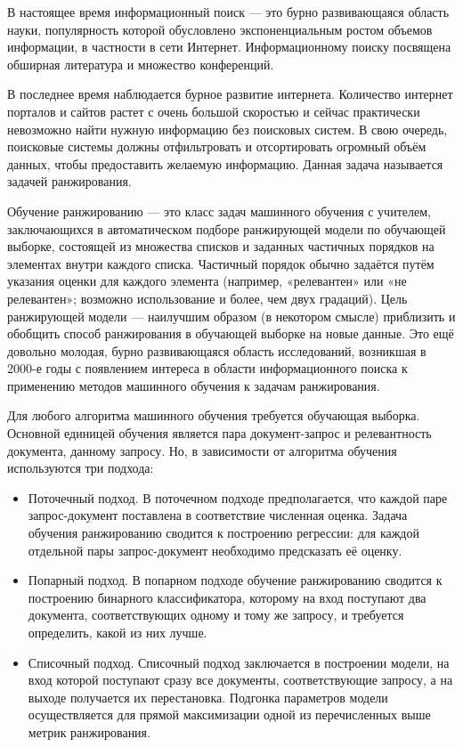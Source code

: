 В настоящее время информационный поиск — это бурно развивающаяся область науки, популярность которой обусловлено экспоненциальным ростом объемов информации, в частности в сети Интернет. Информационному поиску посвящена обширная литература и множество конференций.

В последнее время наблюдается бурное развитие интернета. Количество интернет порталов и сайтов растет с очень большой скоростью и сейчас практически невозможно найти нужную информацию без поисковых систем. В свою очередь, поисковые системы должны отфильтровать и отсортировать огромный объём данных, чтобы предоставить желаемую информацию. Данная задача называется задачей ранжирования. 

Обучение ранжированию — это класс задач машинного обучения с учителем, заключающихся в автоматическом подборе ранжирующей модели по обучающей выборке, состоящей из множества списков и заданных частичных порядков на элементах внутри каждого списка. Частичный порядок обычно задаётся путём указания оценки для каждого элемента (например, «релевантен» или «не релевантен»; возможно использование и более, чем двух градаций). Цель ранжирующей модели — наилучшим образом (в некотором смысле) приблизить и обобщить способ ранжирования в обучающей выборке на новые данные. Это ещё довольно молодая, бурно развивающаяся область исследований, возникшая в 2000-е годы с появлением интереса в области информационного поиска к применению методов машинного обучения к задачам ранжирования.

Для любого алгоритма машинного обучения требуется обучающая выборка. Основной единицей обучения является пара документ-запрос и релевантность документа, данному запросу. Но, в зависимости от алгоритма обучения используются три подхода: 

\begin{itemize}

	\item Поточечный подход. В поточечном подходе предполагается, что каждой паре запрос-документ поставлена в соответствие численная оценка. Задача обучения ранжированию сводится к построению регрессии: для каждой отдельной пары запрос-документ необходимо предсказать её оценку.

	\item Попарный подход. В попарном подходе обучение ранжированию сводится к построению бинарного классификатора, которому на вход поступают два документа, соответствующих одному и тому же запросу, и требуется определить, какой из них лучше.

	\item Списочный подход. Списочный подход заключается в построении модели, на вход которой поступают сразу все документы, соответствующие запросу, а на выходе получается их перестановка. Подгонка параметров модели осуществляется для прямой максимизации одной из перечисленных выше метрик ранжирования.

\end{itemize}


